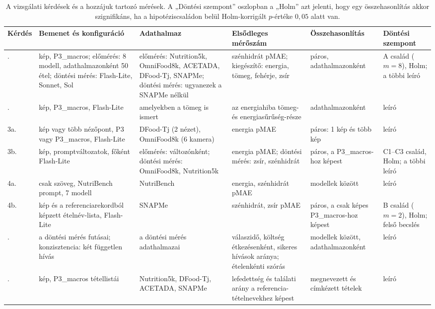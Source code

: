 \begin{table}[htbp]
\centering
\footnotesize
\setlength{\tabcolsep}{3pt}
\caption{A vizsgálati kérdések és a hozzájuk tartozó mérések. A „Döntési szempont” oszlopban 
a „Holm” azt jelenti, hogy egy összehasonlítás akkor szignifikáns, ha a hipotéziscsaládon belül 
Holm-korrigált $p$-értéke $0{,}05$ alatt van.}
\label{tab:kerdes_meres}
\begin{tabular}{>{\raggedright\arraybackslash}p{1.0cm}
                >{\raggedright\arraybackslash}p{3.0cm}
                >{\raggedright\arraybackslash}p{2.7cm}
                >{\raggedright\arraybackslash}p{2.5cm}
                >{\raggedright\arraybackslash}p{2.2cm}
                >{\raggedright\arraybackslash}p{2.0cm}}
\hline
Kérdés & Bemenet és konfiguráció & Adathalmaz & Elsődleges mérőszám & Összehasonlítás & Döntési szempont \\
\hline
1. & kép, P3\_macros; előmérés: 8 modell, adathalmazonként 50 étel; döntési mérés: Flash-Lite, Sonnet, Sol 
   & előmérés: Nutrition5k, OmniFood8k, ACETADA, DFood-Tj, SNAPMe; döntési mérés: ugyanezek a SNAPMe nélkül 
   & szénhidrát pMAE; kiegészítő: energia, tömeg, fehérje, zsír 
   & páros, adathalmazonként 
   & A család ($m = 8$), Holm; a többi leíró \\
2. & kép, P3\_macros, Flash-Lite 
   & amelyekben a tömeg is ismert 
   & az energiahiba tömeg- és energiasűrűség-része 
   & \hspace{0pt}adathalmazonként 
   & leíró \\
3a. & 1 kép vagy több nézőpont, P3 vagy P3\_macros, Flash-Lite 
   & DFood-Tj (2 nézet), OmniFood8k (6 kamera) 
   & energia pMAE 
   & páros: 1 kép és több kép 
   & leíró \\
3b. & kép, promptváltozatok, főként Flash-Lite 
   & előmérés: változónként; döntési mérés: OmniFood8k, Nutrition5k 
   & energia pMAE; döntési mérés: zsír, szénhidrát 
   & páros, a P3\_macros-hoz képest 
   & C1--C3 család, Holm; a többi leíró \\
4a. & csak szöveg, NutriBench prompt, 7 modell 
   & NutriBench 
   & energia, szénhidrát pMAE 
   & modellek között 
   & leíró \\
4b. & kép és a referenciarekordból képzett ételnév-lista, Flash-Lite 
   & SNAPMe 
   & szénhidrát, zsír pMAE 
   & páros, a csak képes P3\_macros-hoz képest 
   & B család ($m = 2$), Holm; felső becslés \\
5. & a döntési mérés futásai; konzisztencia: két független hívás 
   & a döntési mérés adathalmazai 
   & válaszidő, költség étkezésenként, sikeres hívások aránya; ételenkénti szórás 
   & modellek között, adathalmazonként 
   & leíró \\
6. & kép, P3\_macros tétellistái 
   & Nutrition5k, DFood-Tj, ACETADA, SNAPMe 
   & lefedettség és találati arány a referencia-tételnevekhez képest 
   & megnevezett és címkézett tételek 
   & leíró \\
\hline
\end{tabular}
\end{table}


